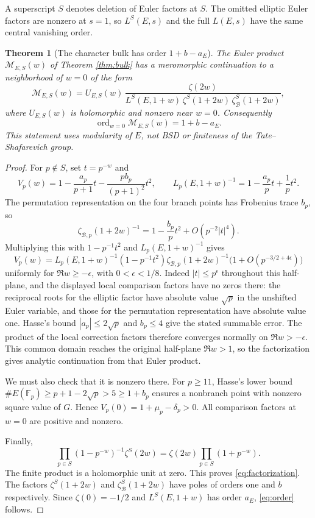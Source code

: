 \documentclass[11pt]{article}
\newtheorem{theorem}{Theorem}[section]
\newcommand{\F}{\mathbb{F}}
\newcommand{\calB}{\mathcal{B}}
\newcommand{\ord}{\operatorname{ord}}
\begin{document}
A superscript $S$ denotes deletion of Euler factors at $S$.  The omitted elliptic Euler factors are nonzero at $s=1$, so $L^S(E,s)$ and the full $L(E,s)$ have the same central vanishing order.

\begin{theorem}[The character bulk has order $1+b-a_E$]\label{thm:order}
The Euler product $\mathcal M_{E,S}(w)$ of Theorem \ref{thm:bulk} has a meromorphic continuation to a neighborhood of $w=0$ of the form
\begin{equation}\label{eq:factorization}
 \boxed{\displaystyle
 \mathcal M_{E,S}(w)=
 U_{E,S}(w)\,
 \frac{\zeta(2w)}
 {L^S(E,1+w)\,\zeta^S(1+2w)\,
  \zeta_{\calB}^S(1+2w)},}
\end{equation}
where $U_{E,S}(w)$ is holomorphic and nonzero near $w=0$.
Consequently
\begin{equation}\label{eq:order}
 \boxed{\displaystyle
 \ord_{w=0}\mathcal M_{E,S}(w)=1+b-a_E.}
\end{equation}
This statement uses modularity of $E$, not BSD or finiteness of the Tate--Shafarevich group.
\end{theorem}
\begin{proof}
For $p\notin S$, set $t=p^{-w}$ and
\[
 V_p(w)=1-\frac{a_p}{p+1}t-\frac{p b_p}{(p+1)^2}t^2,
 \qquad L_p(E,1+w)^{-1}=1-\frac{a_p}{p}t+\frac1p t^2.
\]
The permutation representation on the four branch points has Frobenius trace $b_p$, so
\[
 \zeta_{\calB,p}(1+2w)^{-1}
 =1-\frac{b_p}{p}t^2+O(p^{-2}|t|^4).
\]
Multiplying this with $1-p^{-1}t^2$ and $L_p(E,1+w)^{-1}$ gives
\[
 V_p(w)=L_p(E,1+w)^{-1}(1-p^{-1}t^2)
 \zeta_{\calB,p}(1+2w)^{-1}
 \bigl(1+O(p^{-3/2+4\epsilon})\bigr)
\]
uniformly for $\Re w\ge-\epsilon$, with $0<\epsilon<1/8$. Indeed $|t|\le p^\epsilon$ throughout this half-plane, and the displayed local comparison factors have no zeros there: the reciprocal roots for the elliptic factor have absolute value $\sqrt p$ in the unshifted Euler variable, and those for the permutation representation have absolute value one. Hasse's bound $|a_p|\le2\sqrt p$ and $b_p\le4$ give the stated summable error. The product of the local correction factors therefore converges normally on $\Re w>-\epsilon$. This common domain reaches the original half-plane $\Re w>1$, so the factorization gives analytic continuation from that Euler product.

We must also check that it is nonzero there.  For $p\ge11$, Hasse's lower bound
$\#E(\F_p)\ge p+1-2\sqrt p>5\ge1+b_p$
ensures a nonbranch point with nonzero square value of $G$.  Hence
$V_p(0)=1+\mu_p-\delta_p>0$.  All comparison factors at $w=0$ are positive and nonzero.

Finally,
\[
 \prod_{p\in S}(1-p^{-w})^{-1}\zeta^S(2w)
 =\zeta(2w)\prod_{p\in S}(1+p^{-w}).
\]
The finite product is a holomorphic unit at zero. This proves
\eqref{eq:factorization}. The factors $\zeta^S(1+2w)$ and
$\zeta_{\calB}^S(1+2w)$ have poles of orders one and $b$ respectively.
Since $\zeta(0)=-1/2$ and $L^S(E,1+w)$ has order $a_E$,
\eqref{eq:order} follows.
\end{proof}
\end{document}
